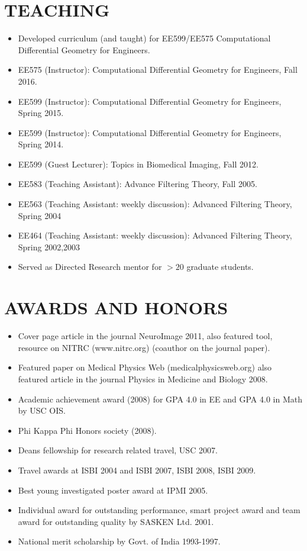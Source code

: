 \documentclass[overlapped,line,letterpaper]{res}
\begin{document}
\begin{resume}
\section{\bf TEACHING}
\begin{itemize}
\item Developed curriculum (and taught) for EE599/EE575 Computational Differential Geometry for Engineers.
\item EE575 (Instructor): Computational Differential Geometry for Engineers, Fall 2016.
\item EE599 (Instructor): Computational Differential Geometry for Engineers, Spring 2015.
\item EE599 (Instructor): Computational Differential Geometry for Engineers, Spring 2014.
\item EE599 (Guest Lecturer): Topics in Biomedical Imaging, Fall 2012.
\item EE583 (Teaching Assistant): Advance Filtering Theory, Fall 2005.
\item EE563 (Teaching Assistant: weekly discussion): Advanced Filtering Theory, Spring 2004
\item EE464 (Teaching Assistant: weekly discussion): Advanced Filtering Theory, Spring 2002,2003
\item Served as Directed Research mentor for $>20$ graduate students.
\end{itemize}

\section{\bf AWARDS AND HONORS}

\begin{itemize}
\item Cover page article in the journal NeuroImage 2011, also featured tool, resource on NITRC (www.nitrc.org) (coauthor on the journal paper).
\item Featured paper on Medical Physics Web (medicalphysicsweb.org) also featured article in the journal Physics in Medicine and Biology 2008.
\item Academic achievement award (2008) for GPA 4.0 in EE and GPA 4.0 in Math by USC OIS.
\item Phi Kappa Phi Honors society (2008).
\item Deans fellowship for research related travel, USC 2007.
\item Travel awards at ISBI 2004 and ISBI 2007, ISBI 2008, ISBI 2009.
\item Best young investigated poster award at IPMI 2005.
\item Individual award for outstanding performance, smart project award and team award for outstanding quality by SASKEN Ltd. 2001.
\item National merit scholarship by Govt. of India 1993-1997.
\end{itemize}


\end{resume}
\end{document}
